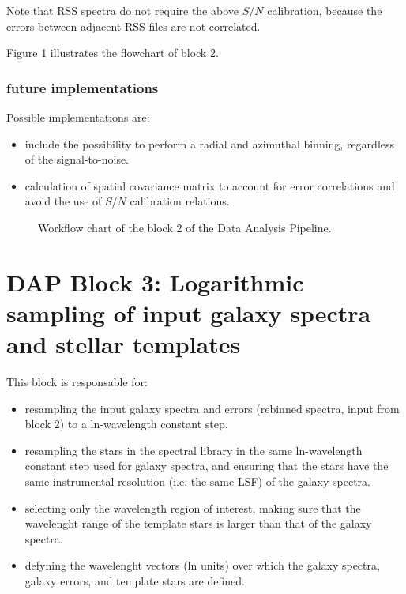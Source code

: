 \documentclass[11pt]{book}
\begin{document}
Note that RSS spectra do not require the above $S/N$ calibration,
because the errors between adjacent RSS files are not correlated.

Figure \ref{dap_fig:block2} illustrates the flowchart of
block 2.

\subsubsection{future implementations}
Possible implementations are:

\begin{itemize}

\item  include the possibility to perform a radial and azimuthal
  binning, regardless of the signal-to-noise.
 \item calculation of spatial covariance matrix to account for error
   correlations and avoid the use of $S/N$ calibration relations.
\end{itemize}

\begin{figure}
\begin{center}
\caption{Workflow chart of the block 2 of the Data Analysis
  Pipeline.}
 \label{dap_fig:block2}
\end{center}
\end{figure}



\section{DAP Block 3: Logarithmic sampling of input galaxy spectra and stellar templates}

This block is responsable for:

\begin{itemize}

\item resampling the input galaxy spectra and errors (rebinned
  spectra, input from block 2) to a ln-wavelength constant step.

\item resampling the stars in the spectral library in the same
  ln-wavelength constant step used for galaxy spectra, and ensuring
  that the stars have the same instrumental resolution (i.e. the same
  LSF) of the galaxy spectra.

\item selecting only the wavelength region of interest, making sure
  that the wavelenght range of the template stars is larger than that
  of the galaxy spectra.

\item defyning the wavelenght vectors (ln units) over which the galaxy
  spectra, galaxy errors, and template stars are defined.

\end{itemize}
\end{document}
